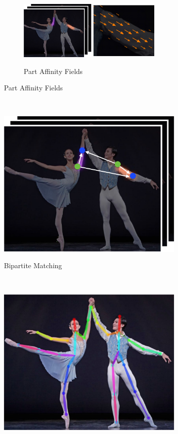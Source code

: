 \begin{figure}[h]
\begin{subfigure}[b]{0.24\textwidth}
    \begin{subfigure}{1\textwidth}
      \includegraphics[width=1\linewidth]{img/openpose_pipeline_c}
      \label{fig:oppC}
      \caption{Part Affinity Fields}
    \end{subfigure}
  \end{subfigure}%
  ~
  \begin{subfigure}[t]{0.24\textwidth}
    \includegraphics[width=1\linewidth]{img/openpose_pipeline_d}
    \label{fig:oppD}
    \caption{Bipartite Matching}
  \end{subfigure}%
  ~
  \begin{subfigure}[t]{0.24\textwidth}
    \includegraphics[width=1\linewidth]{img/openpose_pipeline_e}

\end{subfigure}
\end{figure}
